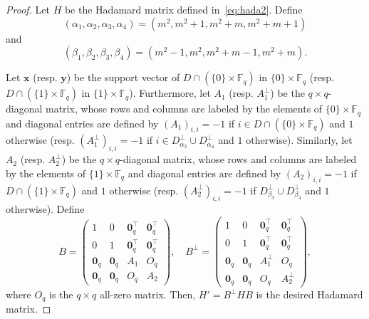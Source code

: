 \documentclass[ALCO,ThmDefs,Unicode]{cedram}
\newcommand*\F{{\mathbb F}}
\newcommand*\tra{\top}
\newcommand*{\bfx}{\mathbf{x}}
\newcommand*{\bfy}{\mathbf{y}}
\newcommand*{\bfo}{\mathbf{0}}
\begin{document}
\begin{proof}
Let $H$ be the Hadamard matrix defined in~\eqref{eq:hada2}. Define
\[
(\alpha_1,\alpha_2,\alpha_3,\alpha_4)=(m^2,m^2+1,m^2+m,m^2+m+1)
\]
and
\[
(\beta_1,\beta_2,\beta_3,\beta_4)=(m^2-1,m^2,m^2+m-1,m^2+m).
\]

Let $\bfx$ (resp. $\bfy$) be the support vector of $D\cap (\{0\}\times \F_q)$ in $\{0\}\times \F_q$ (resp. $D\cap (\{1\}\times \F_q)$ in $\{1\}\times \F_q$). Furthermore, let $A_1$ (resp. $A_1^{\perp}$) be the $q\times q$-diagonal matrix, whose rows and columns are labeled by the elements of $\{0\}\times \F_q$ and diagonal entries are defined by $(A_1)_{i,i}=-1$ if $i\in D\cap (\{0\}\times \F_q)$ and $1$ otherwise (resp. $(A_1^\perp)_{i,i}=-1$ if $i\in D_{\alpha_3}^\perp \cup D_{\alpha_4}^\perp$ and $1$ otherwise). Similarly, let $A_2$ (resp. $A_2^{\perp}$) be the $q\times q$-diagonal matrix, whose rows and columns are labeled by the elements of $\{1\}\times \F_q$ and diagonal entries are defined by $(A_2)_{i,i}=-1$ if $D\cap (\{1\}\times \F_q)$ and $1$ otherwise (resp. $(A_2^\perp)_{i,i}=-1$ if $D_{\beta_3}^\perp \cup D_{\beta_4}^\perp$ and $1$ otherwise). Define
\[
B=
\begin{pmatrix} 1 &0 & \bfo_q^\tra& \bfo_q^\tra \\
0 &1 & \bfo_q^\tra& \bfo_q^\tra \\
\bfo_q &\bfo_q & A_1& O_q \\
\bfo_q & \bfo_q &O_q& A_2
\end{pmatrix}, \quad B^\perp=
\begin{pmatrix} 1 &0 & \bfo_q^\tra& \bfo_q^\tra \\
0 &1 & \bfo_q^\tra& \bfo_q^\tra \\
\bfo_q &\bfo_q & A_1^\perp& O_q \\
\bfo_q & \bfo_q &O_q& A_2^\perp
\end{pmatrix},
\]
where $O_q$ is the $q\times q$ all-zero matrix. Then, $H'=B^\perp H B$ is the desired Hadamard matrix.


\end{proof}
\end{document}
